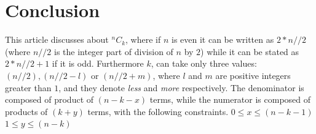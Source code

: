 \documentclass[12pt, twoside]{article}
\newcommand*{\Combination}[2]{{}^{#1}C_{#2}}%
\begin{document}
\section{Conclusion}\label{Summary}
This article discusses about $\Combination{n}{k}$, where if $n$ is even it can be written as $2*n//2$ (where $n//2$ is the integer part of division of $n$ by $2$) while it can be stated as $2*n//2+1$ if it is odd. Furthermore $k$, can take only three values: $(n//2), (n//2 - l) \text{ or } (n//2 + m)$, where $l$ and $m$ are positive integers greater than $1$, and they denote \textit{less} and \textit{more} respectively.\newline\newline
The denominator is composed of product of $(n-k-x)$ terms, while the numerator is composed of products of $(k+y)$ terms, with the following constraints.\newline\newline
$0 \leq x \leq (n-k-1)$\newline
$1 \leq y \leq (n-k)$\newline
\end{document}
